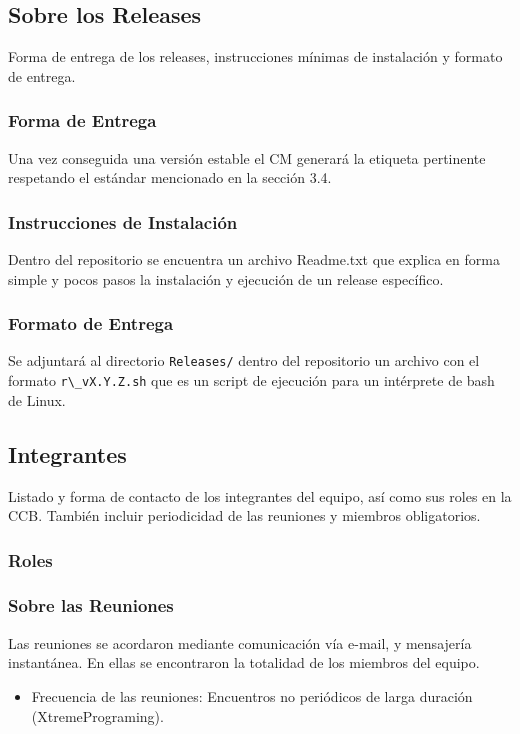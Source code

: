 \documentclass[10pt]{article} %
\begin{document}
\subsection{Sobre los Releases}
Forma de entrega de los releases, instrucciones mínimas de instalación y formato de entrega.

\subsubsection{Forma de Entrega}
Una vez conseguida una versión estable el CM generará la etiqueta pertinente respetando el estándar mencionado en la sección 3.4.%

\subsubsection{Instrucciones de Instalación}
Dentro del repositorio se encuentra un archivo Readme.txt que explica en forma simple y pocos pasos la instalación y ejecución de un release específico.

\subsubsection{Formato de Entrega}
Se adjuntará al directorio \verb+Releases/+ dentro del repositorio un archivo con el formato \verb+r\_vX.Y.Z.sh+ que es un script de ejecución para un intérprete de bash de Linux.

\subsection{Integrantes}
Listado y forma de contacto de los integrantes del equipo, así como sus roles en la CCB. También incluir periodicidad de las reuniones y miembros obligatorios.
\subsubsection{Roles}


\subsubsection{Sobre las Reuniones}
Las reuniones se acordaron mediante comunicación vía e-mail, y mensajería instantánea. En ellas se encontraron la totalidad de los miembros del equipo.
\begin{itemize}
\item Frecuencia de las reuniones: Encuentros no periódicos de larga duración (XtremePrograming).
\end{itemize}
\end{document}

